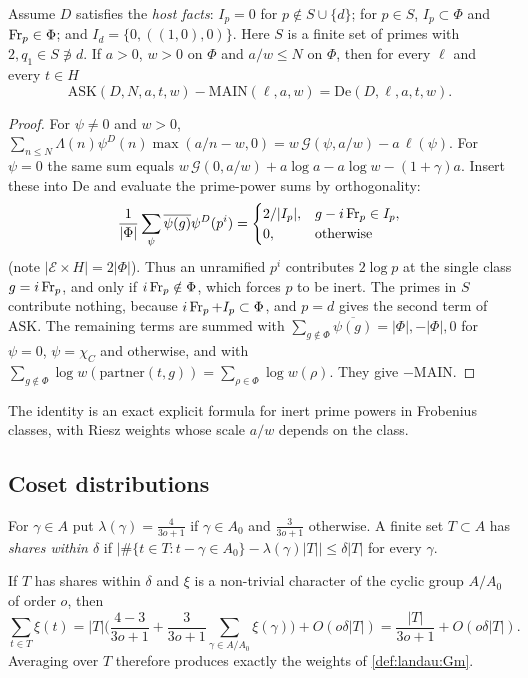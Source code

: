 \begin{proposition}\label{prop:balance}
Assume $D$ satisfies the \emph{host facts}: $I_p=0$ for $p\notin S\cup\{d\}$; for $p\in S$,
$I_p\subset\Phi$ and $\operatorname{Fr}_p\in\Phi$; and $I_d=\{0,((1,0),0)\}$. Here $S$ is a finite set of primes with
$2,q_1\in S\not\ni d$. If $a>0$, $w>0$ on $\Phi$ and $a/w\le N$ on $\Phi$, then for every $\ell$ and
every $t\in H$
\[
\mathrm{ASK}(D,N,a,t,w)-\mathrm{MAIN}(\ell,a,w)=\mathrm{De}(D,\ell,a,t,w).
\]
\end{proposition}

\begin{proof}
For $\psi\neq0$ and $w>0$,
$\sum_{n\le N}\Lambda(n)\psi^D(n)\max(a/n-w,0)=w\,\mathcal G(\psi,a/w)-a\,\ell(\psi)$. For $\psi=0$ the same
sum equals $w\,\mathcal G(0,a/w)+a\log a-a\log w-(1+\gamma)a$. Insert these into $\mathrm{De}$ and
evaluate the prime-power sums by orthogonality:
\[
\frac1{|\Phi|}\sum_\psi\overline{\psi(g)}\psi^D(p^i)=\begin{cases}2/|I_p|,& g-i\operatorname{Fr}_p\in I_p,\\ 0,&\text{otherwise}\end{cases}
\]
(note $|\mathcal E\times H|=2|\Phi|$). Thus an unramified $p^i$ contributes $2\log p$ at the single
class $g=i\operatorname{Fr}_p$, and only if $i\operatorname{Fr}_p\notin\Phi$, which forces $p$ to be inert. The primes in $S$
contribute nothing, because $i\operatorname{Fr}_p+I_p\subset\Phi$, and $p=d$ gives the second term of
$\mathrm{ASK}$. The remaining terms are summed with
$\sum_{g\notin\Phi}\overline{\psi(g)}=|\Phi|,-|\Phi|,0$ for $\psi=0$, $\psi=\chi_C$ and otherwise, and
with $\sum_{g\notin\Phi}\log w(\mathrm{partner}(t,g))=\sum_{\rho\in\Phi}\log w(\rho)$. They give
$-\mathrm{MAIN}$.
\end{proof}

The identity is an exact explicit formula for inert prime powers in Frobenius classes, with Riesz
weights whose scale $a/w$ depends on the class.

\subsection{Coset distributions}

For $\gamma\in A$ put $\lambda(\gamma)=\frac4{3o+1}$ if $\gamma\in A_0$ and $\frac3{3o+1}$ otherwise.
A finite set $T\subset A$ has \emph{shares within $\delta$} if
$|\#\{t\in T:t-\gamma\in A_0\}-\lambda(\gamma)|T||\le\delta|T|$ for every $\gamma$.

\begin{remark}\label{rem:hosts:fourier}
If $T$ has shares within $\delta$ and $\xi$ is a non-trivial character of the cyclic group $A/A_0$ of
order $o$, then
\[
\sum_{t\in T}\xi(t)=|T|\Big(\frac{4-3}{3o+1}+\frac3{3o+1}\sum_{\gamma\in A/A_0}\xi(\gamma)\Big)+O(o\delta|T|)
=\frac{|T|}{3o+1}+O(o\delta|T|).
\]
Averaging over $T$ therefore produces exactly the weights of \cref{def:landau:Gm}.
\end{remark}


